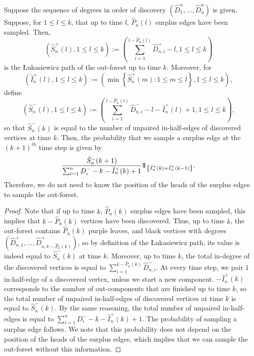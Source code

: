 \begin{lemma}\label{lemma.sampleoutforest}
Suppose the sequence of degrees in order of discovery $(\hat{D}^n_1,\dots,\hat{D}^n_n)$ is given. Suppose, for $1\leq l\leq k$, that up to time $l$, $\hat{P}_n(l)$ surplus edges have been sampled. Then, $$\left(\hat{S}^+_n(l),1\leq l\leq k \right):=\left(\sum_{i=1}^{l-\hat{P}_n(l)}\hat{D}^+_{n,i}-l,1\leq l\leq k\right)$$ is the \L ukasiewicz path of the out-forest up to time $k$. Moreover, for $$\left(\hat{I}^+_n(l),1\leq l\leq k\right):=\left(\min\left\{\hat{S}^+_n(m):1\leq m \leq l\right\},1\leq l \leq k \right),$$
define 
$$\left(\hat{S}^-_n(l),1\leq l \leq k\right):=\left(\sum_{i=1}^{l-\hat{P}_n(l)}\hat{D}^-_{n,i}-l-\hat{I}^+_n(l)+1,1\leq l\leq k\right),$$
so that $\hat{S}^-_n(k)$ is equal to the number of unpaired in-half-edges of discovered vertices at time $k$. Then, the probability that we sample a surplus edge at the $(k+1)^{th}$ time step is given by
$$\frac{\hat{S}^-_n(k+1)}{\sum_{i=1}^n D^-_i-k-\hat{I}^+_n(k)+1}\one_{\left\{\hat{I}^+_n(k)=\hat{I}^+_n(k-1)\right\}}.$$
Therefore, we do not need to know the position of the heads of the surplus edges to sample the out-forest.
\end{lemma}
\begin{proof}
Note that if up to time $k$, $\hat{P}_n(k)$ surplus edges have been sampled, this implies that $k-\hat{P}_n(k)$ vertices have been discovered. Thus, up to time $k$, the out-forest contains $\hat{P}_n(k)$ purple leaves, and black vertices with degrees $(\hat{D}^+_{n,1},\dots,\hat{D}^+_{n,k-\hat{P}_n(k)})$, so by definition of the \L ukasiewicz path, its value is indeed equal to $\hat{S}^-_n(k)$ at time $k$. Moreover, up to time $k$, the total in-degree of the discovered vertices is equal to $\sum_{i=1}^{k-\hat{P}_n(k)}\hat{D}^-_{n,i}$. At every time step, we pair $1$ in-half-edge of a discovered vertex, unless we start a new component. $-\hat{I}^+_n(k)$ corresponds to the number of out-components that are finished up to time $k$, so the total number of unpaired in-half-edges of discovered vertices at time $k$ is equal to $\hat{S}^-_n(k)$. By the same reasoning, the total number of unpaired in-half-edges is equal to $\sum_{i=1}^n D^-_i-k-\hat{I}^+_n(k)+1$. The probability of sampling a surplus edge follows. We note that this probability does not depend on the position of the heads of the surplus edges, which implies that we can sample the out-forest without this information.
\end{proof}
